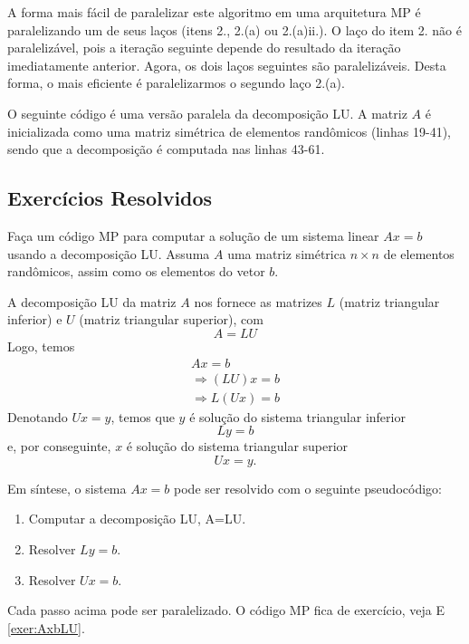 A forma mais fácil de paralelizar este algoritmo em uma arquitetura MP é paralelizando um de seus laços (itens 2., 2.(a) ou 2.(a)ii.). O laço do item 2. não é paralelizável, pois a iteração seguinte depende do resultado da iteração imediatamente anterior. Agora, os dois laços seguintes são paralelizáveis. Desta forma, o mais eficiente é paralelizarmos o segundo laço 2.(a).

O seguinte código é uma versão paralela da decomposição LU. A matriz $A$ é inicializada como uma matriz simétrica de elementos randômicos (linhas 19-41), sendo que a decomposição é computada nas linhas 43-61.



\subsection*{Exercícios Resolvidos}

\begin{exeresol}\label{exeresol:AxbLU}
  Faça um código MP para computar a solução de um sistema linear $Ax=b$ usando a decomposição LU. Assuma $A$ uma matriz simétrica $n\times n$ de elementos randômicos, assim como os elementos do vetor $b$.
\end{exeresol}
\begin{resol}
  A decomposição LU da matriz $A$ nos fornece as matrizes $L$ (matriz triangular inferior) e $U$ (matriz triangular superior), com
  \begin{equation}
    A = LU
  \end{equation}
  Logo, temos
  \begin{gather}
    Ax = b\\
    \Rightarrow (LU)x = b\\
    \Rightarrow L(Ux)=b
  \end{gather}
  Denotando $Ux = y$, temos que $y$ é solução do sistema triangular inferior
  \begin{equation}
    Ly = b
  \end{equation}
  e, por conseguinte, $x$ é solução do sistema triangular superior
  \begin{equation}
    Ux = y.
  \end{equation}

  Em síntese, o sistema $Ax=b$ pode ser resolvido com o seguinte pseudocódigo:
  \begin{enumerate}
  \item Computar a decomposição LU, A=LU.
  \item Resolver $Ly = b$.
  \item Resolver $Ux = b$.
  \end{enumerate}
  Cada passo acima pode ser paralelizado. O código MP fica de exercício, veja E \ref{exer:AxbLU}.  
\end{resol}

